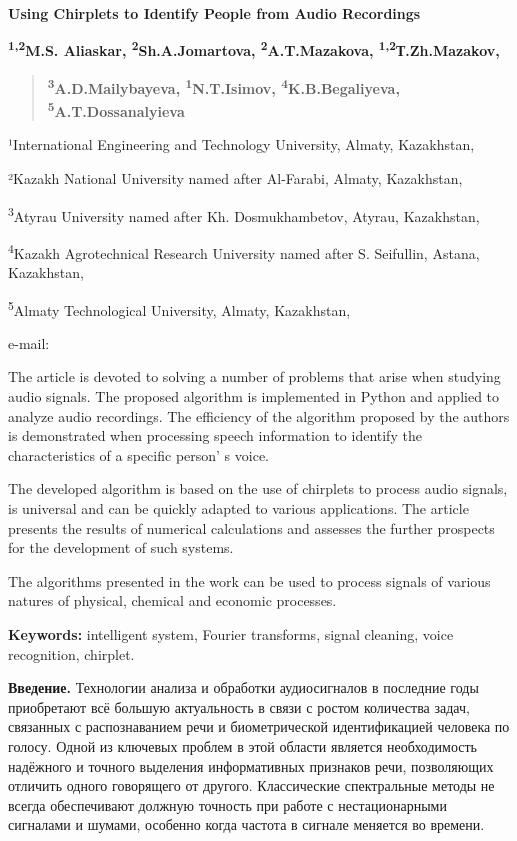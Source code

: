 {\bfseries \hfill\break
}

{\bfseries Using Chirplets to Identify People from Audio Recordings}

{\bfseries \textsuperscript{1,2}M.S. Aliaskar,
\textsuperscript{2}Sh.A.Jomartova\textsuperscript{\envelope },
\textsuperscript{2}A.T.Mazakova, \textsuperscript{1,2}Т.Zh.Mazakov,}

\begin{quote}
{\bfseries \textsuperscript{3}A.D.Mailybayeva,
\textsuperscript{1}N.T.Isimov, \textsuperscript{4}K.B.Begaliyeva,
\textsuperscript{5}A.T.Dossanalyieva}
\end{quote}

¹International Engineering and Technology University, Almaty,
Kazakhstan,

²Kazakh National University named after Al-Farabi, Almaty, Kazakhstan,

\textsuperscript{3}Atyrau University named after Kh. Dosmukhambetov,
Atyrau, Kazakhstan,

\textsuperscript{4}Kazakh Agrotechnical Research University named after
S. Seifullin, Astana, Kazakhstan,

\textsuperscript{5}Almaty Technological University, Almaty, Kazakhstan,

e-mail: \href{mailto:jomartova@mail.ru}{}

The article is devoted to solving a number of problems that arise when
studying audio signals. The proposed algorithm is implemented in Python
and applied to analyze audio recordings. The efficiency of the algorithm
proposed by the authors is demonstrated when processing speech
information to identify the characteristics of a specific
person' s voice.

The developed algorithm is based on the use of chirplets to process
audio signals, is universal and can be quickly adapted to various
applications. The article presents the results of numerical calculations
and assesses the further prospects for the development of such systems.

The algorithms presented in the work can be used to process signals of
various natures of physical, chemical and economic processes.

{\bfseries Keywords:} intelligent system, Fourier transforms, signal
cleaning, voice recognition, chirplet.

{\bfseries Введение.} Технологии анализа и обработки аудиосигналов в
последние годы приобретают всё большую актуальность в связи с ростом
количества задач, связанных с распознаванием речи и биометрической
идентификацией человека по голосу. Одной из ключевых проблем в этой
области является необходимость надёжного и точного выделения
информативных признаков речи, позволяющих отличить одного говорящего от
другого. Классические спектральные методы не всегда обеспечивают должную
точность при работе с нестационарными сигналами и шумами, особенно когда
частота в сигнале меняется во времени.

